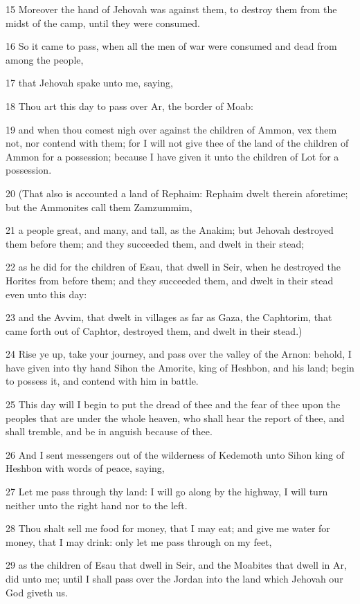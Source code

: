 \par 15 Moreover the hand of Jehovah was against them, to destroy them from the midst of the camp, until they were consumed.
\par 16 So it came to pass, when all the men of war were consumed and dead from among the people,
\par 17 that Jehovah spake unto me, saying,
\par 18 Thou art this day to pass over Ar, the border of Moab:
\par 19 and when thou comest nigh over against the children of Ammon, vex them not, nor contend with them; for I will not give thee of the land of the children of Ammon for a possession; because I have given it unto the children of Lot for a possession.
\par 20 (That also is accounted a land of Rephaim: Rephaim dwelt therein aforetime; but the Ammonites call them Zamzummim,
\par 21 a people great, and many, and tall, as the Anakim; but Jehovah destroyed them before them; and they succeeded them, and dwelt in their stead;
\par 22 as he did for the children of Esau, that dwell in Seir, when he destroyed the Horites from before them; and they succeeded them, and dwelt in their stead even unto this day:
\par 23 and the Avvim, that dwelt in villages as far as Gaza, the Caphtorim, that came forth out of Caphtor, destroyed them, and dwelt in their stead.)
\par 24 Rise ye up, take your journey, and pass over the valley of the Arnon: behold, I have given into thy hand Sihon the Amorite, king of Heshbon, and his land; begin to possess it, and contend with him in battle.
\par 25 This day will I begin to put the dread of thee and the fear of thee upon the peoples that are under the whole heaven, who shall hear the report of thee, and shall tremble, and be in anguish because of thee.
\par 26 And I sent messengers out of the wilderness of Kedemoth unto Sihon king of Heshbon with words of peace, saying,
\par 27 Let me pass through thy land: I will go along by the highway, I will turn neither unto the right hand nor to the left.
\par 28 Thou shalt sell me food for money, that I may eat; and give me water for money, that I may drink: only let me pass through on my feet,
\par 29 as the children of Esau that dwell in Seir, and the Moabites that dwell in Ar, did unto me; until I shall pass over the Jordan into the land which Jehovah our God giveth us.
